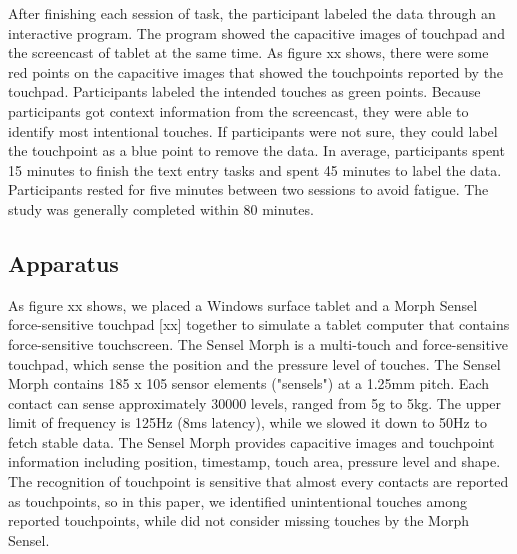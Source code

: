 
After finishing each session of task, the participant labeled the data through an interactive program. The program showed the capacitive images of touchpad and the screencast of tablet at the same time. As figure xx shows, there were some red points on the capacitive images that showed the touchpoints reported by the touchpad. Participants labeled the intended touches as green points. Because participants got context information from the screencast, they were able to identify most intentional touches. If participants were not sure, they could label the touchpoint as a blue point to remove the data. In average, participants spent 15 minutes to finish the text entry tasks and spent 45 minutes to label the data. Participants rested for five minutes between two sessions to avoid fatigue. The study was generally completed within 80 minutes.


\subsection{Apparatus}

As figure xx shows, we placed a Windows surface tablet and a Morph Sensel force-sensitive touchpad [xx] together to simulate a tablet computer that contains force-sensitive touchscreen. The Sensel Morph is a multi-touch and force-sensitive touchpad, which sense the position and the pressure level of touches. The Sensel Morph contains 185 x 105 sensor elements ("sensels") at a 1.25mm pitch. Each contact can sense approximately 30000 levels, ranged from 5g to 5kg. The upper limit of frequency is 125Hz (8ms latency), while we slowed it down to 50Hz to fetch stable data. The Sensel Morph provides capacitive images and touchpoint information including position, timestamp, touch area, pressure level and shape. The recognition of touchpoint is sensitive that almost every contacts are reported as touchpoints, so in this paper, we identified unintentional touches among reported touchpoints, while did not consider missing touches by the Morph Sensel.

